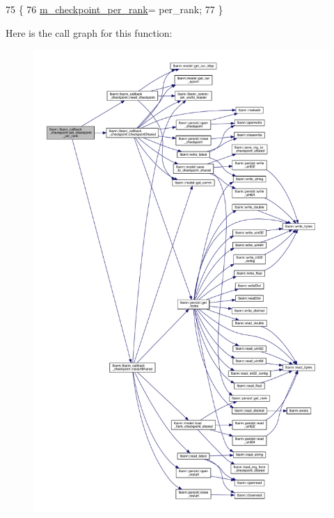 \begin{DoxyCode}
75                                                     \{
76     \hyperlink{classlbann_1_1lbann__callback__checkpoint_a36af7331ddf213339fe7282cb53ffedc}{m\_checkpoint\_per\_rank}= per\_rank;
77   \}
\end{DoxyCode}
Here is the call graph for this function\+:\nopagebreak
\begin{figure}[H]
\begin{center}
\leavevmode
\includegraphics[width=350pt]{classlbann_1_1lbann__callback__checkpoint_ac3a0bb250a679b28924910c0dc617809_cgraph}
\end{center}
\end{figure}
\mbox{\label{classlbann_1_1lbann__callback__checkpoint_a91a0e5627986654d719930ba5eeebc9e}} 
